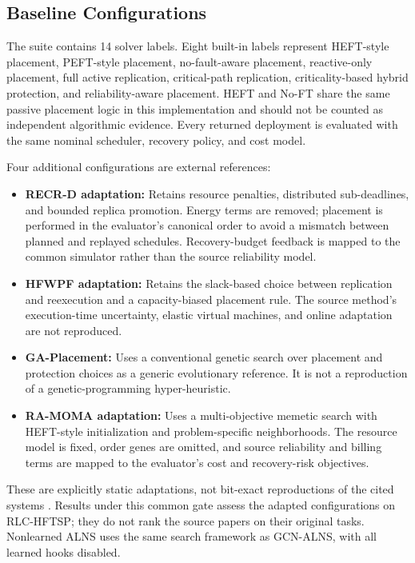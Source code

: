 \subsection{Baseline Configurations}
\label{sec:baselines}
The suite contains 14 solver labels. Eight built-in labels represent
HEFT-style placement, PEFT-style placement, no-fault-aware placement,
reactive-only placement, full active replication, critical-path replication,
criticality-based hybrid protection, and reliability-aware placement.
HEFT and No-FT share the same passive placement logic in this implementation
and should not be counted as independent algorithmic evidence. Every
returned deployment is evaluated with the same nominal scheduler, recovery
policy, and cost model.

Four additional configurations are external references:
\begin{itemize}
 \item \textbf{RECR-D adaptation:} Retains resource penalties, distributed
 sub-deadlines, and bounded replica promotion. Energy terms are removed;
 placement is performed in the evaluator's canonical order to avoid a
 mismatch between planned and replayed schedules. Recovery-budget feedback
 is mapped to the common simulator rather than the source reliability model.
 \item \textbf{HFWPF adaptation:} Retains the slack-based choice between
 replication and reexecution and a capacity-biased placement rule. The
 source method's execution-time uncertainty, elastic virtual machines, and
 online adaptation are not reproduced.
 \item \textbf{GA-Placement:} Uses a conventional genetic search over placement
 and protection choices as a generic evolutionary reference. It is not a
 reproduction of a genetic-programming hyper-heuristic.
 \item \textbf{RA-MOMA adaptation:} Uses a multi-objective memetic search with
 HEFT-style initialization and problem-specific neighborhoods. The resource
 model is fixed, order genes are omitted, and source reliability and billing
 terms are mapped to the evaluator's cost and recovery-risk objectives.
\end{itemize}
These are explicitly static adaptations, not bit-exact reproductions of
the cited systems \cite{taghinezhad2025recrd,ren2026hfwpf,qin2023ramoma}.
Results under this common gate assess the adapted configurations on
RLC-HFTSP; they do not rank the source papers on their original tasks.
Nonlearned ALNS uses the same search framework as GCN-ALNS, with all learned
hooks disabled.

